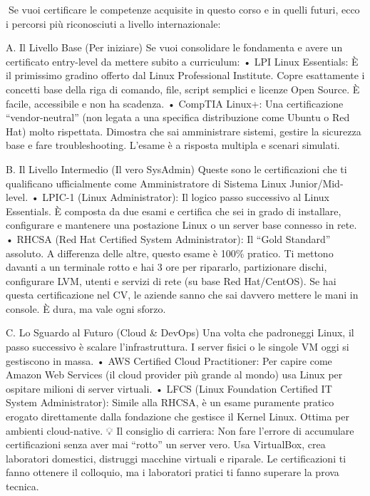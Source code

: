 \documentclass[11pt,a4paper]{article}
\begin{document}
Se vuoi certificare le competenze acquisite in questo corso e in quelli
futuri, ecco i percorsi più riconosciuti a livello internazionale:

A. Il Livello Base (Per iniziare) Se vuoi consolidare le fondamenta e
avere un certificato entry-level da mettere subito a curriculum: • LPI
Linux Essentials: È il primissimo gradino offerto dal Linux Professional
Institute. Copre esattamente i concetti base della riga di comando,
file, script semplici e licenze Open Source. È facile, accessibile e non
ha scadenza. • CompTIA Linux+: Una certificazione ``vendor-neutral''
(non legata a una specifica distribuzione come Ubuntu o Red Hat) molto
rispettata. Dimostra che sai amministrare sistemi, gestire la sicurezza
base e fare troubleshooting. L'esame è a risposta multipla e scenari
simulati.

B. Il Livello Intermedio (Il vero SysAdmin) Queste sono le
certificazioni che ti qualificano ufficialmente come Amministratore di
Sistema Linux Junior/Mid-level. • LPIC-1 (Linux Administrator): Il
logico passo successivo al Linux Essentials. È composta da due esami e
certifica che sei in grado di installare, configurare e mantenere una
postazione Linux o un server base connesso in rete. • RHCSA (Red Hat
Certified System Administrator): Il ``Gold Standard'' assoluto. A
differenza delle altre, questo esame è 100\% pratico. Ti mettono davanti
a un terminale rotto e hai 3 ore per ripararlo, partizionare dischi,
configurare LVM, utenti e servizi di rete (su base Red Hat/CentOS). Se
hai questa certificazione nel CV, le aziende sanno che sai davvero
mettere le mani in console. È dura, ma vale ogni sforzo.

C. Lo Sguardo al Futuro (Cloud \& DevOps) Una volta che padroneggi
Linux, il passo successivo è scalare l'infrastruttura. I server fisici o
le singole VM oggi si gestiscono in massa. • AWS Certified Cloud
Practitioner: Per capire come Amazon Web Services (il cloud provider più
grande al mondo) usa Linux per ospitare milioni di server virtuali. •
LFCS (Linux Foundation Certified IT System Administrator): Simile alla
RHCSA, è un esame puramente pratico erogato direttamente dalla
fondazione che gestisce il Kernel Linux. Ottima per ambienti
cloud-native. 💡 Il consiglio di carriera: Non fare l'errore di
accumulare certificazioni senza aver mai ``rotto'' un server vero. Usa
VirtualBox, crea laboratori domestici, distruggi macchine virtuali e
riparale. Le certificazioni ti fanno ottenere il colloquio, ma i
laboratori pratici ti fanno superare la prova tecnica.


\end{document}
